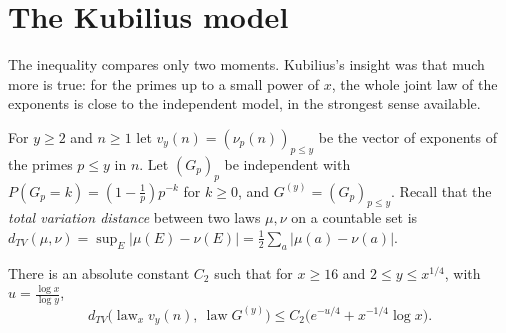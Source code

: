 \section{The Kubilius model}

The inequality compares only two moments. Kubilius's insight was that much more is true: for the primes up to a small power of $x$, the whole joint law of the exponents is close to the independent model, in the strongest sense available.

For $y\ge2$ and $n\ge1$ let $v_y(n)=(\nu_p(n))_{p\le y}$ be the vector of exponents of the primes $p\le y$ in $n$. Let $(G_p)_p$ be independent with $P(G_p=k)=(1-\frac1p)p^{-k}$ for $k\ge0$, and $G^{(y)}=(G_p)_{p\le y}$. Recall that the \emph{total variation distance} between two laws $\mu,\nu$ on a countable set is $d_{TV}(\mu,\nu)=\sup_E|\mu(E)-\nu(E)|=\frac12\sum_a|\mu(a)-\nu(a)|$.

\begin{theorem}[Kubilius]\label{thm:kubilius}
There is an absolute constant $C_2$ such that for $x\ge16$ and $2\le y\le x^{1/4}$, with $u=\frac{\log x}{\log y}$,
\[
d_{TV}\bigl(\operatorname{law}_x v_y(n),\ \operatorname{law}G^{(y)}\bigr)\le C_2\bigl(e^{-u/4}+x^{-1/4}\log x\bigr).
\]
\end{theorem}

